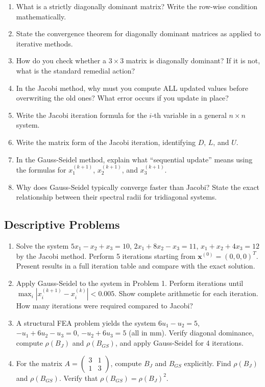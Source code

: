 \documentclass[12pt,a4paper]{article}
\begin{document}
\begin{enumerate}
  \item What is a strictly diagonally dominant matrix? Write the row-wise condition mathematically.
  \item State the convergence theorem for diagonally dominant matrices as applied to iterative methods.
  \item How do you check whether a \(3 \times 3\) matrix is diagonally dominant? If it is not,
        what is the standard remedial action?
  \item In the Jacobi method, why must you compute ALL updated values before overwriting the old ones?
        What error occurs if you update in place?
  \item Write the Jacobi iteration formula for the \(i\)-th variable in a general \(n \times n\) system.
  \item Write the matrix form of the Jacobi iteration, identifying \(D\), \(L\), and \(U\).
  \item In the Gauss-Seidel method, explain what ``sequential update'' means using the formulas
        for \(x_1^{(k+1)}\), \(x_2^{(k+1)}\), and \(x_3^{(k+1)}\).
  \item Why does Gauss-Seidel typically converge faster than Jacobi? State the exact relationship
        between their spectral radii for tridiagonal systems.
\end{enumerate}

\subsection*{Descriptive Problems}

\begin{enumerate}
  \item Solve the system \(5x_1 - x_2 + x_3 = 10\), \(2x_1 + 8x_2 - x_3 = 11\),
        \(x_1 + x_2 + 4x_3 = 12\) by the Jacobi method. Perform 5 iterations starting from
        \(\mathbf{x}^{(0)} = (0,0,0)^T\). Present results in a full iteration table and
        compare with the exact solution.
  \item Apply Gauss-Seidel to the system in Problem 1. Perform iterations until
        \(\max_i|x_i^{(k+1)}-x_i^{(k)}| < 0.005\). Show complete arithmetic for each iteration.
        How many iterations were required compared to Jacobi?
  \item A structural FEA problem yields the system \(6u_1 - u_2 = 5\), \(-u_1 + 6u_2 - u_3 = 0\),
        \(-u_2 + 6u_3 = 5\) (all in mm). Verify diagonal dominance, compute \(\rho(B_J)\) and
        \(\rho(B_{GS})\), and apply Gauss-Seidel for 4 iterations.
  \item For the matrix \(A = \begin{pmatrix}3&1\\1&3\end{pmatrix}\), compute \(B_J\) and
        \(B_{GS}\) explicitly. Find \(\rho(B_J)\) and \(\rho(B_{GS})\). Verify that
        \(\rho(B_{GS}) = \rho(B_J)^2\).
\end{enumerate}
\end{document}
